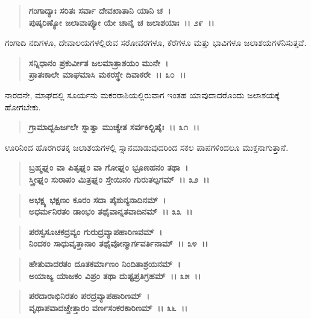 \begin{verse}
\textbf{ಗಂಗಾದ್ಯಾಃ ಸರಿತಃ ಸರ್ವಾ ದೇವಖಾತಾನಿ ಯಾನಿ ಚ~।}\\\textbf{ಪುಷ್ಕರಿಣ್ಯೋ ಜಲಾವಾಪ್ಯೋ ಯೇ ಚಾನೈ ಚ ಜಲಾಶಯಾಃ~।। ೨೯~।।}
\end{verse}

ಗಂಗಾದಿ ನದಿಗಳೂ, ದೇವಾಲಯಗಳಲ್ಲಿರುವ ಸರೋವರಗಳೂ, ಕೆರೆಗಳೂ ಮತ್ತು ಭಾವಿಗಳೂ ಜಲಾಶಯಗಳೆನಿಸುತ್ತವೆ.

\begin{verse}
\textbf{ಸನ್ನಿಧಾನಂ ಪ್ರಕುರ್ವೀತ ಜಲಮಾತ್ರಾಶಯಂ ಮುನೇ~।}\\\textbf{ಪ್ರಾತಃಕಾಲೇ ಮಾಘಮಾಸಿ ಮಕರಸ್ಥೇ ದಿವಾಕರೇ~।। ೩೦~।।}
\end{verse}

ನಾರದನೇ, ಮಾಘದಲ್ಲಿ ಸೂರ್ಯನು ಮಕರರಾಶಿಯಲ್ಲಿರುವಾಗ ಇಂತಹ ಯಾವುದಾದರೊಂದು ಜಲಾಶಯಕ್ಕೆ ಹೋಗಬೇಕು.

\begin{verse}
\textbf{ಗ್ರಾಮಾದ್ಬಹಿರ್ಜಲೇ ಸ್ನಾತ್ವಾ ಮುಚ್ಯೇತ ಸರ್ವಕಿಲ್ಬಿಷೈಃ~।। ೩೧~।।}
\end{verse}

ಊರಿನಿಂದ ಹೊರಗಿರತಕ್ಕ ಜಲಾಶಯಗಳಲ್ಲಿ ಸ್ನಾನಮಾಡುವುದರಿಂದ ಸಕಲ ಪಾಪಗಳಿಂದಲೂ ಮುಕ್ತನಾಗುತ್ತಾನೆ.

\begin{verse}
\textbf{ಬ್ರಹ್ಮಘ್ನಂ ವಾ ಪಿತೃಘ್ನಂ ವಾ ಗೋಘ್ನಂ ಭ್ರೂಣಹನಂ ತಥಾ~।}\\\textbf{ಸ್ತ್ರೀಘ್ನಂ ಸುರಾಪಂ ಮಿತ್ರಘ್ನಂ ಸ್ತೇಯಿನಂ ಗುರುತಲ್ಪಗಮ್~।। ೩೨~।।}
\end{verse}

\begin{verse}
\textbf{ಅಭಕ್ಷ್ಯ ಭಕ್ಷಣಂ ಕೂರಂ ಸದಾ ಪೈಶುನ್ಯನಾದಿನಮ್~।}\\\textbf{ಅಧರ್ಮನಿರತಂ ಡಾಂಭಂ ತಥೈವಾನ್ನತವಾದಿನಮ್~।। ೩೩~।।}
\end{verse}

\begin{verse}
\textbf{ಪರಸ್ವಸೂಚಕದ್ರವ್ಯಂ ಗುರುದ್ರವ್ಯಾಪಹಾರಿಣವಮ್~।}\\\textbf{ನಿಂದಕಂ ಸಾಧುವೃತ್ತಾನಾಂ ತಥೈವೋನ್ಮಾರ್ಗವರ್ತಿನಾಮ್~।। ೩೪~।।}
\end{verse}

\begin{verse}
\textbf{ಹೇತುವಾದರತಂ ದೂತಕರ್ಮಾಣಂ ನಿಂದಿತಾಶ್ರಯನಮ್~।}\\\textbf{ಅಯಾಜ್ಯ ಯಾಜಕಂ ವಿಪ್ರಂ ತಥಾ ದುಷ್ಟಪ್ರತಿಗ್ರಹಮ್~।। ೩೫~।।}
\end{verse}

\begin{verse}
\textbf{ಪರದಾರಾಭಿನಿರತಂ ಪರದ್ರವ್ಯಾಪಹಾರಿಣಮ್~।}\\\textbf{ವೃಥಾಪವಾದಚ್ಚೇತ್ತಾರಂ ವರ್ಣಸಂಕರಕಾರಿಣಮ್~।। ೩೬~।।}
\end{verse}

